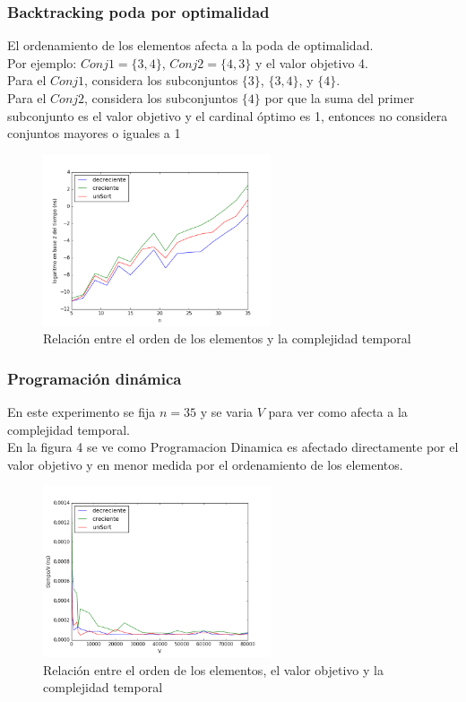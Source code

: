 \subsubsection{Backtracking poda por optimalidad}
El ordenamiento de los elementos afecta a la poda de optimalidad.\\
Por ejemplo: $Conj1 = \{3,4\}$, $Conj2 = \{4,3\}$ y el valor objetivo 4. \\
Para el $Conj1$, considera los subconjuntos $\{ 3\}$, $\{ 3,4\}$, y $\{4\}$.\\
Para el $Conj2$, considera los subconjuntos $\{4\}$ por que la suma del primer subconjunto es el valor objetivo y el cardinal óptimo es 1, entonces no considera conjuntos mayores o iguales a 1\\
\begin{figure}[h]
\centering
\includegraphics[width=0.6\textwidth]{opSort.png}
\caption{Relación entre el orden de los elementos y la complejidad temporal}
\end{figure}

\subsubsection{Programación dinámica}
En este experimento se fija $n=35$ y se varia $V$ para ver como afecta a la complejidad temporal.\\
En la figura 4 se ve como Programacion Dinamica es afectado directamente por el valor objetivo y en menor medida por el ordenamiento de los elementos.
\begin{figure}[h]
\centering
\includegraphics[width=0.6\textwidth]{pdObjetivo.png}
\caption{Relación entre el orden de los elementos, el valor objetivo y la complejidad temporal}
\end{figure}

